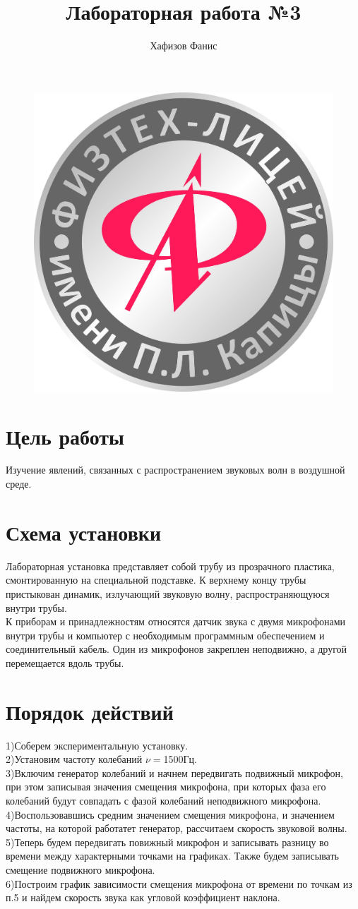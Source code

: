 \documentclass[12pt]{article}
\title{Лабораторная работа №3\\}
\author{Хафизов Фанис}
\begin{document}
	\begin{figure}
		\centering
		\includegraphics[width=0.3\linewidth]{logo}
	\end{figure}
	\maketitle
	\newpage
	\section{Цель работы}
	Изучение явлений, связанных с распространением звуковых волн в воздушной среде.
	\section{Схема установки}
	Лабораторная установка представляет собой трубу из прозрачного пластика,
	смонтированную на специальной подставке. К верхнему концу трубы пристыкован динамик, излучающий звуковую волну, распространяющуюся внутри трубы.\\
	К приборам и принадлежностям относятся датчик звука с двумя микрофонами внутри трубы и компьютер с необходимым программным обеспечением и соединительный кабель. Один из микрофонов закреплен неподвижно, а другой перемещается вдоль трубы.
	\section{Порядок действий}
	1)Соберем экспериментальную установку.\\
	2)Установим частоту колебаний $\nu=$1500Гц.\\
	3)Включим генератор колебаний и начнем передвигать подвижный микрофон, при этом записывая значения смещения микрофона, при которых фаза его колебаний будут совпадать с фазой колебаний неподвижного микрофона.\\
	4)Воспользовавшись средним значением смещения микрофона, и значением частоты, на которой работатет генератор, рассчитаем скорость звуковой волны.\\
	5)Теперь будем передвигать повижный микрофон и записывать разницу во времени между характерными точками на графиках. Также будем записывать смещение подвижного микрофона.\\
	6)Построим график зависимости смещения микрофона от времени по точкам из п.5 и найдем скорость звука как угловой коэффициент наклона.
\end{document}
